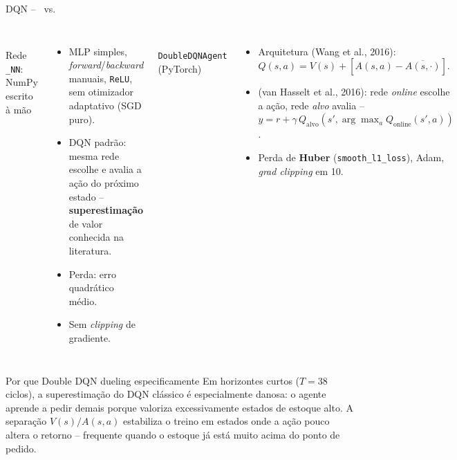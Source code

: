 \begin{frame}{DQN -- \antes\ vs. \depois}
  \begin{columns}[T,onlytextwidth]
      \antes\\[0.3em]
      \small Rede \texttt{\_NN}: NumPy escrito à mão
      \begin{itemize}\footnotesize
        \item MLP simples, \textit{forward}/\textit{backward} manuais,
          \texttt{ReLU}, sem otimizador adaptativo (SGD puro).
        \item DQN padrão: mesma rede escolhe e avalia a ação do próximo
          estado -- \textbf{superestimação} de valor conhecida na
          literatura.
        \item Perda: erro quadrático médio.
        \item Sem \textit{clipping} de gradiente.
      \end{itemize}
      \depois\\[0.3em]
      \small \texttt{DoubleDQNAgent} (PyTorch)
      \begin{itemize}\footnotesize
        \item Arquitetura  (Wang et al., 2016):
          $Q(s,a)=V(s)+[A(s,a)-\overline{A(s,\cdot)}]$.
        \item {} (van Hasselt et al., 2016): rede
          \textit{online} escolhe a ação, rede \textit{alvo} avalia --
          $y=r+\gamma\,Q_{\text{alvo}}(s',\arg\max_a Q_{\text{online}}(s',a))$.
        \item Perda de \textbf{Huber} (\texttt{smooth\_l1\_loss}), Adam,
          \textit{grad clipping} em 10.
      \end{itemize}
  \end{columns}
  \vspace{0.6em}

  \begin{block}{Por que Double DQN dueling especificamente}
    \small Em horizontes curtos ($T=38$ ciclos), a superestimação do DQN
    clássico é especialmente danosa: o agente aprende a pedir demais
    porque valoriza excessivamente estados de estoque alto. A separação
    $V(s)/A(s,a)$ estabiliza o treino em estados onde a ação pouco altera
    o retorno -- frequente quando o estoque já está muito acima do ponto
    de pedido.
  \end{block}

\end{frame}
